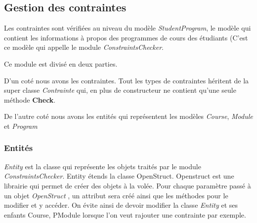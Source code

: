 \subsection{Gestion des contraintes}
Les contraintes sont vérifiées au niveau du modèle \textit{StudentProgram}, le modèle qui contient les informations à propos des programmes de cours des étudiants (C'est ce modèle qui appelle le module \textit{ConstraintsChecker}. 

Ce module est divisé en deux parties.

D'un coté nous avons les contraintes. Tout les types de contraintes héritent de la super classe \textit{Contrainte} qui, en plus de constructeur ne contient qu'une seule méthode \textbf{Check}.

De l'autre coté nous avons les entités qui représentent les modèles \textit{Course}, \textit{Module} et \textit{Program}

\subsubsection{Entités}
\textit{Entity} est la classe qui représente les objets traités par le module \textit{ConstraintsChecker}. Entity étends la classe OpenStruct. Openstruct est une librairie qui permet de créer des objets à la volée. Pour chaque paramètre passé à un objet \textit{OpenStruct} \cite{OpenStruct}, un attribut sera créé ainsi que les méthodes pour le modifier et y accéder. On évite ainsi de devoir modifier la classe \textit{Entity} et ses enfants {Course, PModule} lorsque l'on veut rajouter une contrainte par exemple.

